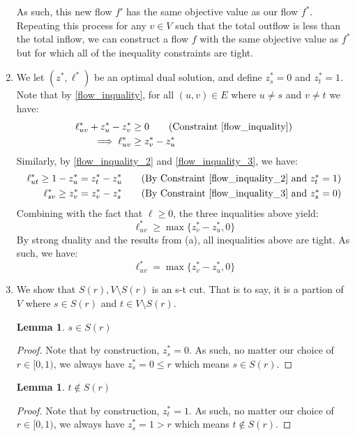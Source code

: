 \documentclass[12pt]{exam}
\newtheorem{lemma}[theorem]{Lemma}
\begin{document}
\begin{questions}
\begin{solution}
\begin{enumerate}[label=(\alph*)]
  As such, this new flow $f'$ has the same objective value as our flow $f^*$. Repeating this process for any $v \in V$ such that the total outflow is less than the total inflow, we can construct a flow $f$ with the same objective value as $f^*$ but for which all of the inequality constraints are tight.

  \item 
    We let $(z^*, \ell^*)$ be an optimal dual solution, and define $z_s^* = 0$ and $z_t^* = 1$. Note that by \ref{flow_inquality}, for all $(u,v) \in E$ where $u \neq s$ and $v \neq t$ we have:
    \begin{align*}
      \ell^*_{uv} + z^*_u - z^*_v &\geq 0 \tag{Constraint \ref{flow_inquality}} \\
      \implies \ell^*_{uv} &\geq z^*_v - z^*_u
    \end{align*}
    Similarly, by \ref{flow_inquality_2} and \ref{flow_inquality_3}, we have:
    \begin{align*}
      \ell^*_{ut} \geq 1 - z^*_u = z^*_t - z^*_u \tag{By Constraint \ref{flow_inquality_2} and $z^*_t = 1$} \\
      \ell^*_{sv} \geq z^*_v = z^*_v - z^*_s \tag{By Constraint \ref{flow_inquality_3} and $z^*_s = 0$}
    \end{align*}
    Combining with the fact that $\ell \geq 0$, the three inqualities above yield:
    \[
      \ell^*_{uv} \geq \max \{z^*_v - z^*_u,0  \} \tag{ for all $(u,v) \in E$}
    \]
    By strong duality and the results from (a), all inequalities above are tight. As such, we have:
    \[
      \ell^*_{uv} = \max \{ z_v^* - z_u^*, 0\}
    \]
  \item
    We show that $S(r), V \setminus S(r)$ is an s-t cut. That is to say, it is a partion of $V$ where $s \in S(r)$ and $t \in V \setminus S(r)$. 
    \begin{lemma}
      $s \in S(r)$
    \end{lemma}
    \begin{proof}
      Note that by construction, $z_s^* = 0$. As such, no matter our choice of $r \in [0, 1)$, we always have $z^*_s = 0 \leq r$ which means $s \in S(r)$.
    \end{proof}
    \begin{lemma}
      $t \notin S(r)$
    \end{lemma}
    \begin{proof}
      Note that by construction, $z_t^* = 1$. As such, no matter our choice of $r \in [0, 1)$, we always have $z^*_s = 1 > r$ which means $t \notin S(r)$.

\end{proof}
\end{enumerate}
\end{solution}
\end{questions}
\end{document}
